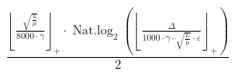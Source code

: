\[\frac{\left\lfloor \frac{\sqrt{\frac{L}{\mu}}}{8000 \cdot \gamma} \right\rfloor_{+} \cdot \operatorname{Nat.log}_{2}\left(\left\lfloor \frac{\Delta}{1000 \cdot \gamma \cdot \sqrt{\frac{L}{\mu}} \cdot \varepsilon} \right\rfloor_{+}\right)}{2}\]
